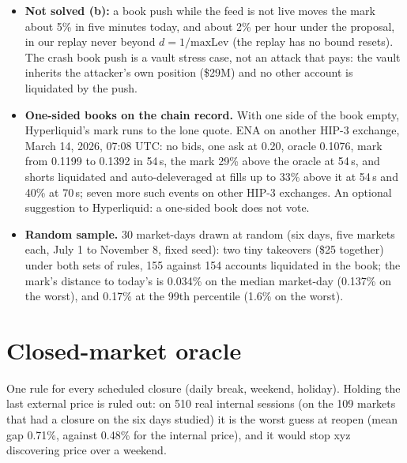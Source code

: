 \documentclass[10.5pt,a4paper]{article}
\begin{document}
{\begin{itemize}[leftmargin=1.2em,itemsep=.2ex,topsep=.3ex]
\item \textbf{Not solved (b):} a book push while the feed is not live moves the mark about 5\% in five minutes today, and about 2\% per hour under the proposal, in our replay never beyond $d = 1/\text{maxLev}$ (the replay has no bound resets). The crash book push is a vault stress case, not an attack that pays: the vault inherits the attacker's own position (\$29M) and no other account is liquidated by the push.
\item \textbf{One-sided books on the chain record.} With one side of the book empty, Hyperliquid's mark runs to the lone quote. ENA on another HIP-3 exchange, March 14, 2026, 07:08 UTC: no bids, one ask at 0.20, oracle 0.1076, mark from 0.1199 to 0.1392 in 54\,s, the mark 29\% above the oracle at 54\,s, and shorts liquidated and auto-deleveraged at fills up to 33\% above it at 54\,s and 40\% at 70\,s; seven more such events on other HIP-3 exchanges. An optional suggestion to Hyperliquid: a one-sided book does not vote.
\item \textbf{Random sample.} 30 market-days drawn at random (six days, five markets each, July 1 to November 8, fixed seed): two tiny takeovers (\$25 together) under both sets of rules, 155 against 154 accounts liquidated in the book; the mark's distance to today's is 0.034\% on the median market-day (0.137\% on the worst), and 0.17\% at the 99th percentile (1.6\% on the worst).
\end{itemize}}

\section{Closed-market oracle}\label{sec:closed}
One rule for every scheduled closure (daily break, weekend, holiday). Holding the last external price is ruled out: on 510 real internal sessions (on the 109 markets that had a closure on the six days studied) it is the worst guess at reopen (mean gap 0.71\%, against 0.48\% for the internal price), and it would stop xyz discovering price over a weekend.
\end{document}
